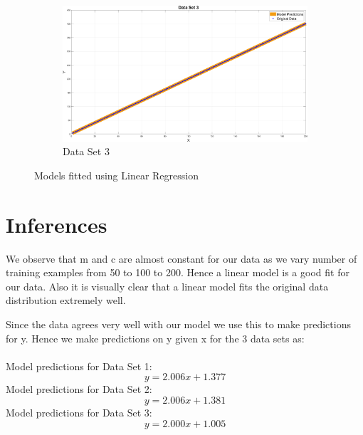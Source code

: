 \documentclass[14pt]{article}
\begin{document}
    \begin{figure}[h]\ContinuedFloat
        \begin{subfigure}{\textwidth}
            \centering
            \includegraphics[width = \textwidth]{Images/Table_data3.png}
            \caption{Data Set 3}
        \end{subfigure}
        \caption{Models fitted using Linear Regression}
    \end{figure}


    \huge
    \section{Inferences}
    \normalsize
    We observe that m and c are almost constant for our data as we vary number of training examples from 50 to 100 to 200. Hence a linear model is a good fit for our data.
    Also it is visually clear that a linear model fits the original data distribution extremely well.

    Since the data agrees very well with our model we use this to make predictions for y.
    Hence we make predictions on y given x for the 3 data sets as:\\ \\
    \noindent Model predictions for Data Set 1:
    \[ y = 2.006x + 1.377 \]
    \noindent Model predictions for Data Set 2:
    \[ y = 2.006x + 1.381 \]
    \noindent Model predictions for Data Set 3:
    \[ y = 2.000x + 1.005 \]

    

    \pagebreak
    \nocite{*}
    
    
\end{document}
